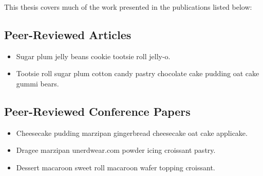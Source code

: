 This thesis covers much of the work presented in the publications listed below:

\subsection{Peer-Reviewed Articles}
\renewcommand{\thefootnote}{\fnsymbol{footnote}}
\vspace{1em}
\begin{itemize}
\onehalfspacing
\item Sugar plum jelly beans cookie tootsie roll jelly-o.
\item Tootsie roll sugar plum cotton candy pastry chocolate cake pudding oat cake gummi bears. 
\end{itemize}

\subsection{Peer-Reviewed Conference Papers}
\vspace{1em}
\begin{itemize}
\onehalfspacing
\item Cheesecake pudding marzipan gingerbread cheesecake oat cake applicake.
\item  Dragee marzipan unerdwear.com powder icing croissant pastry. 
\item  Dessert macaroon sweet roll macaroon wafer topping croissant. 

\end{itemize}

